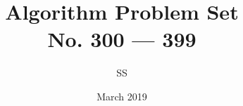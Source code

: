 \documentclass[a4paper,12pt]{article}
\title{Algorithm Problem Set \\ \large No. 300 --- 399}
\author{SS}
\date{March 2019}
\begin{document}
\renewcommand{\thelstlisting}{\thesection.\arabic{lstlisting}}
\maketitle

% 
% 
% 
% 
% 
% 
% 
% 
% 
% 
% 
% 
% 
% 
% 
% 
% 
% 
% 
% 
% 
% 
% 
% 
% 
% 
% 
% 
% 
% 
% 
% 
% 
% 
% 
% 
% 
% 
% 
% 
% 
% 
% 
% 
% 
% 
% 
% 
% 
% 
% 
% 
% 
% 
% 
% 
% 
% 
% 
% 
% 
% 
% 
% 
% 
% 
% 
% 
% 
% 
% 
% 
% 
% 
% 
% 
% 
% 
% 
% 
% 
% 
% 

%
%
%
%
%
%
%
%
%
%
%
%
%
%
%
\end{document}
